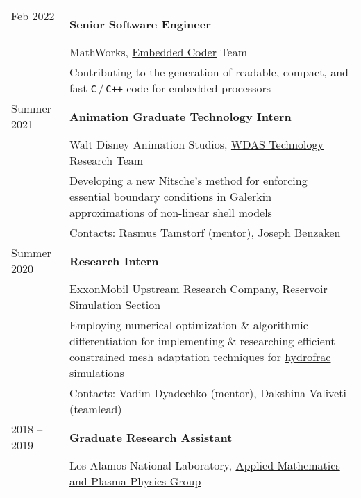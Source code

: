 \documentclass[a4paper,12pt]{article}
\begin{document}
	\begin{longtable}{ l >{\raggedright\arraybackslash}p{15cm} }
		Feb 2022 --
			& \textbf{Senior Software Engineer}\vspace{1mm}\\
			& MathWorks, \href{https://www.mathworks.com/products/embedded-coder.html}{Embedded Coder} Team\vspace{1mm}\\
			& Contributing to the generation of readable, compact, and fast \texttt{C}\,/\,\texttt{C++} code for embedded processors\vspace{3mm}\\
		Summer 2021
			& \textbf{Animation Graduate Technology Intern}\vspace{1mm}\\
			& Walt Disney Animation Studios, \href{https://www.disneyanimation.com/technology/}{WDAS Technology} Research Team\vspace{1mm}\\
			& Developing a new Nitsche's method for enforcing essential boundary conditions in Galerkin approximations of non-linear shell models\vspace{1mm}\\
			& Contacts: Rasmus Tamstorf (mentor), Joseph Benzaken\vspace{3mm}\\
		Summer 2020
			& \textbf{Research Intern}\vspace{1mm}\\
			& \href{https://corporate.exxonmobil.com/}{ExxonMobil} Upstream Research Company, Reservoir Simulation Section\vspace{1mm}\\
			& Employing numerical optimization \& algorithmic differentiation for implementing \& researching efficient constrained mesh adaptation techniques for \href{https://en.wikipedia.org/wiki/Hydraulic_fracturing}{hydrofrac} simulations\vspace{1mm}\\
			& Contacts: Vadim Dyadechko (mentor), Dakshina Valiveti (teamlead) \vspace{3mm}\\			
		2018 -- 2019
			& \textbf{Graduate Research Assistant}\vspace{1mm}\\
			& Los Alamos National Laboratory, \href{https://www.lanl.gov/org/ddste/aldsc/theoretical/applied-mathematics-plasma-physics/index.php}{Applied Mathematics and Plasma Physics Group}\vspace{1mm}\\

\end{longtable}
\end{document}
